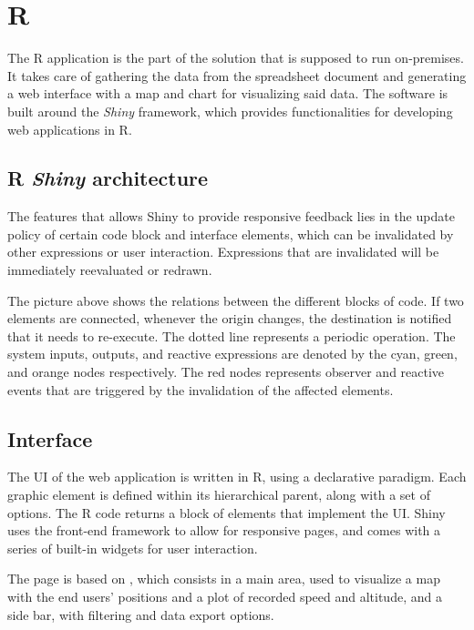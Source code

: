 \section{R}
The R application is the part of the solution that is supposed to run on-premises.
It takes care of gathering the data from the spreadsheet document and generating a web interface with a map and chart for visualizing said data.
The software is built around the \emph{Shiny} framework, which provides functionalities for developing web applications in R.


\subsection{R \emph{Shiny} architecture}
The features that allows Shiny to provide responsive feedback lies in the update policy of certain code block and interface elements, which can be invalidated by other expressions or user interaction.
Expressions that are invalidated will be immediately reevaluated or redrawn.


The picture above shows the relations between the different blocks of code.
If two elements are connected, whenever the origin changes, the destination is notified that it needs to re-execute.
The dotted line represents a periodic operation.
The system inputs, outputs, and reactive expressions are denoted by the cyan, green, and orange nodes respectively.
The red nodes represents observer and reactive events that are triggered by the invalidation of the affected elements.


\subsection{Interface}
The UI of the web application is written in R, using a declarative paradigm.
Each graphic element is defined within its hierarchical parent, along with a set of options.
The R code returns a block of  elements that implement the UI.
Shiny uses the  front-end framework to allow for responsive pages, and comes with a series of built-in widgets for user interaction.

The page is based on , which consists in a main area, used to visualize a map with the end users' positions and a plot of recorded speed and altitude, and a side bar, with filtering and data export options.


